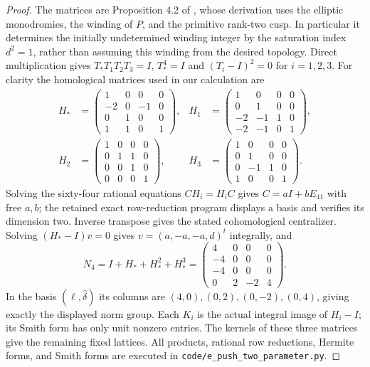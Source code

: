 \begin{proof}
The matrices are Proposition 4.2 of \cite{ViaTwo26push}, whose
derivation uses the elliptic monodromies, the winding of $P$,
and the primitive rank-two cusp.  In particular it determines
the initially undetermined winding integer by the saturation
index $d^2=1$, rather than assuming this winding from the
desired topology.  Direct multiplication gives
$T_*T_1T_2T_3=I$, $T_*^4=I$ and
$(T_i-I)^2=0$ for $i=1,2,3$.
For clarity the homological matrices used in our calculation are
\[
\begin{aligned}
 H_*&=\begin{pmatrix}1&0&0&0\\-2&0&-1&0\\0&1&0&0\\1&1&0&1\end{pmatrix},&
 H_1&=\begin{pmatrix}1&0&0&0\\0&1&0&0\\-2&-1&1&0\\-2&-1&0&1\end{pmatrix},\\
 H_2&=\begin{pmatrix}1&0&0&0\\0&1&1&0\\0&0&1&0\\0&0&0&1\end{pmatrix},&
 H_3&=\begin{pmatrix}1&0&0&0\\0&1&0&0\\0&-1&1&0\\1&0&0&1\end{pmatrix}.
\end{aligned}
\]
Solving the sixty-four rational equations $CH_i=H_iC$
gives $C=aI+bE_{41}$ with free $a,b$; the retained exact
row-reduction program displays a basis and verifies its
dimension two.  Inverse transpose gives the stated
cohomological centralizer.  Solving $(H_*-I)v=0$ gives
$v=(a,-a,-a,d)^t$ integrally, and
\[
 N_4=I+H_*+H_*^2+H_*^3
 =\begin{pmatrix}4&0&0&0\\-4&0&0&0\\-4&0&0&0\\0&2&-2&4\end{pmatrix}.
\]
In the basis $(\ell,\widehat\delta)$ its columns are
$(4,0),(0,2),(0,-2),(0,4)$, giving exactly the displayed
norm group.  Each $K_i$ is the actual integral image of
$H_i-I$; its Smith form has only unit nonzero entries.
The kernels of these three matrices give the remaining fixed
lattices.  All products, rational row reductions, Hermite forms,
and Smith forms are executed in
\texttt{code/e\_push\_two\_parameter.py}.
\end{proof}

